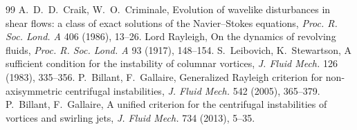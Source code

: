 \documentclass[11pt]{article}
\theoremstyle{plain}
\theoremstyle{remark}
\begin{document}
\begin{thebibliography}{99}
 A.~D.~D.~Craik, W.~O.~Criminale, Evolution of wavelike disturbances in shear flows: a class of exact solutions of the Navier--Stokes equations, \emph{Proc. R. Soc. Lond. A} 406 (1986), 13--26.
 Lord Rayleigh, On the dynamics of revolving fluids, \emph{Proc. R. Soc. Lond. A} 93 (1917), 148--154.
 S.~Leibovich, K.~Stewartson, A sufficient condition for the instability of columnar vortices, \emph{J. Fluid Mech.} 126 (1983), 335--356.
 P.~Billant, F.~Gallaire, Generalized Rayleigh criterion for non-axisymmetric centrifugal instabilities, \emph{J. Fluid Mech.} 542 (2005), 365--379.
 P.~Billant, F.~Gallaire, A unified criterion for the centrifugal instabilities of vortices and swirling jets, \emph{J. Fluid Mech.} 734 (2013), 5--35.
\end{thebibliography}
\end{document}
